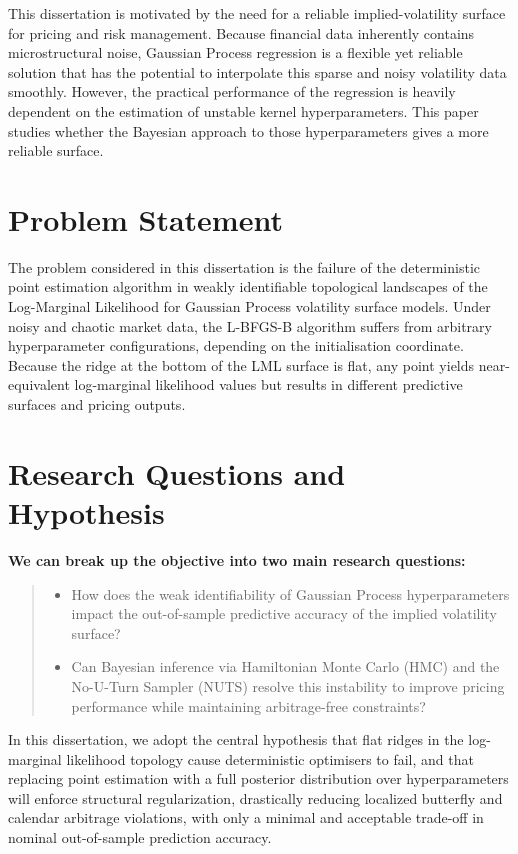 \documentclass[12pt,oneside]{report}
\theoremstyle{definition}
\theoremstyle{remark}
\begin{document}
This dissertation is motivated by the need for a reliable implied-volatility surface for pricing and risk management. Because financial data inherently contains microstructural noise, Gaussian Process regression is a flexible yet reliable solution that has the potential to interpolate this sparse and noisy volatility data smoothly. However, the practical performance of the regression is heavily dependent on the estimation of unstable kernel hyperparameters. This paper studies whether the Bayesian approach to those hyperparameters gives a more reliable surface.

\section{Problem Statement}

The problem considered in this dissertation is the failure of the deterministic point estimation algorithm in weakly identifiable topological landscapes of the Log-Marginal Likelihood for Gaussian Process volatility surface models. Under noisy and chaotic market data, the L-BFGS-B algorithm suffers from arbitrary hyperparameter configurations, depending on the initialisation coordinate. Because the ridge at the bottom of the LML surface is flat, any point yields near-equivalent log-marginal likelihood values but results in different predictive surfaces and pricing outputs.

\section{Research Questions and Hypothesis}
\label{sec:hypothesis}
\textbf{We can break up the objective into two main research questions:}
\begin{quote}
\begin{itemize}
	\item How does the weak identifiability of Gaussian Process hyperparameters impact the out-of-sample predictive accuracy of the implied volatility surface?

	\item Can Bayesian inference via Hamiltonian Monte Carlo (HMC) and the No-U-Turn Sampler (NUTS) \cite{neal2011mcmc, hoffman2014nuts} resolve this instability to improve pricing performance while maintaining arbitrage-free constraints?
\end{itemize}
\end{quote}
In this dissertation, we adopt the central hypothesis that flat ridges in the log-marginal likelihood topology cause deterministic optimisers to fail, and that replacing point estimation with a full posterior distribution over hyperparameters will enforce structural regularization, drastically reducing localized butterfly and calendar arbitrage violations, with only a minimal and acceptable trade-off in nominal out-of-sample prediction accuracy.
\end{document}
